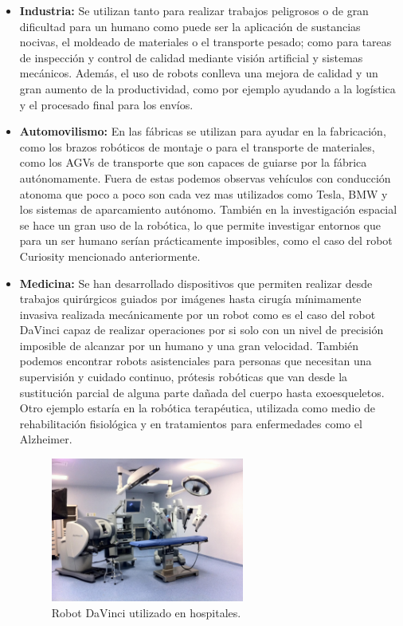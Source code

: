 \begin{itemize}
		\item \textbf{Industria: }Se utilizan tanto para realizar trabajos peligrosos o de gran dificultad para un humano como puede ser la aplicación de sustancias nocivas, el moldeado de materiales o el transporte pesado; como para tareas de inspección y control de calidad mediante visión artificial y sistemas mecánicos. Además, el uso de robots conlleva una mejora de calidad y un gran aumento de la productividad, como por ejemplo ayudando a la logística y el procesado final para los envíos.
		\item \textbf{Automovilismo: }En las fábricas se utilizan para ayudar en la fabricación, como los brazos robóticos de montaje o para el transporte de materiales, como los AGVs de transporte que son capaces de guiarse por la fábrica autónomamente. Fuera de estas podemos observas vehículos con conducción atonoma que poco a poco son cada vez mas utilizados como Tesla, BMW y los sistemas de aparcamiento autónomo. También en la investigación espacial se hace un gran uso de la robótica, lo que permite investigar entornos que para un ser humano serían prácticamente imposibles, como el caso del robot Curiosity mencionado anteriormente.
		\item \textbf{Medicina: }Se han desarrollado dispositivos que permiten realizar desde trabajos quirúrgicos guiados por imágenes hasta cirugía mínimamente invasiva realizada mecánicamente por un robot como es el caso del robot DaVinci capaz de realizar operaciones por si solo con un nivel de precisión imposible de alcanzar por un humano y una gran velocidad. También podemos encontrar robots asistenciales para personas que necesitan una supervisión y cuidado continuo, prótesis robóticas que van desde la sustitución parcial de alguna parte dañada del cuerpo hasta exoesqueletos. Otro ejemplo estaría en la robótica terapéutica, utilizada como medio de rehabilitación fisiológica y en tratamientos para enfermedades como el Alzheimer.
		
		\begin{figure}[H]
			\begin{center}
				\includegraphics[width=0.6\textwidth]{imag/IMG13.jpeg}
					\caption{Robot DaVinci utilizado en hospitales.}
			\label{fig:Robot DaVinci.}	
			\end{center}
		\end{figure}	
			

\end{itemize}
